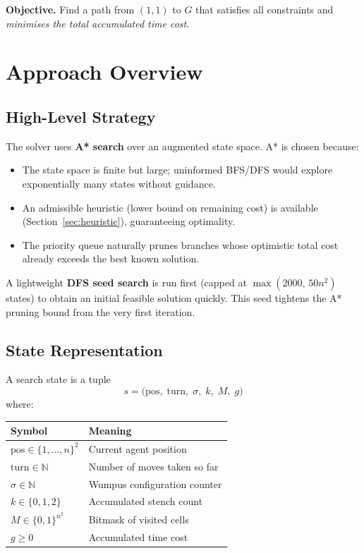 \documentclass[12pt,a4paper]{article}
\begin{document}
\noindent\textbf{Objective.} Find a path from $(1,1)$ to $G$ that satisfies all
constraints and \emph{minimises the total accumulated time cost}.

\section{Approach Overview}

\subsection{High-Level Strategy}

The solver uses \textbf{A* search} over an augmented state space.  A* is
chosen because:

\begin{itemize}
  \item The state space is finite but large; uninformed BFS/DFS would explore
        exponentially many states without guidance.
  \item An admissible heuristic (lower bound on remaining cost) is available
        (Section~\ref{sec:heuristic}), guaranteeing optimality.
  \item The priority queue naturally prunes branches whose optimistic total cost
        already exceeds the best known solution.
\end{itemize}

A lightweight \textbf{DFS seed search} is run first (capped at
$\max(2000,\,50n^2)$ states) to obtain an initial feasible solution quickly.
This seed tightens the A* pruning bound from the very first iteration.

\subsection{State Representation}

A search state is a tuple
\[
  s = \bigl(\text{pos},\; \text{turn},\; \sigma,\; k,\; M,\; g\bigr)
\]
where:
\begin{center}
\begin{tabular}{ll}
\toprule
Symbol & Meaning \\
\midrule
$\text{pos} \in \{1,\ldots,n\}^2$ & Current agent position \\
$\text{turn} \in \mathbb{N}$ & Number of moves taken so far \\
$\sigma \in \mathbb{N}$ & Wumpus configuration counter \\
$k \in \{0,1,2\}$ & Accumulated stench count \\
$M \in \{0,1\}^{n^2}$ & Bitmask of visited cells \\
$g \ge 0$ & Accumulated time cost \\
\bottomrule
\end{tabular}
\end{center}
\end{document}
